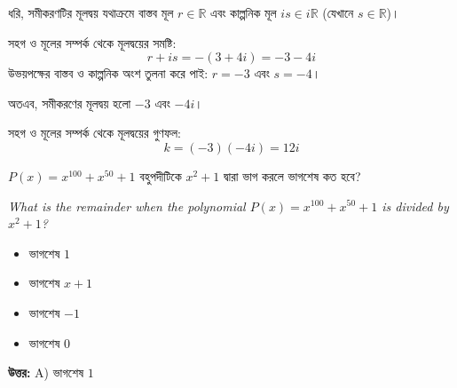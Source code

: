 \documentclass[12pt, a4paper]{article}
\begin{document}
\begin{tcolorbox}[solutionbox={সমাধান (Solution)}]
    \noindent
    ধরি, সমীকরণটির মূলদ্বয় যথাক্রমে বাস্তব মূল $r \in \mathbb{R}$ এবং কাল্পনিক মূল $is \in i\mathbb{R}$ (যেখানে $s \in \mathbb{R}$)। 
    
    সহগ ও মূলের সম্পর্ক থেকে মূলদ্বয়ের সমষ্টি:
    \[ r + is = -(3+4i) = -3 - 4i \]
    উভয়পক্ষের বাস্তব ও কাল্পনিক অংশ তুলনা করে পাই: $r = -3$ এবং $s = -4$। 
    
    অতএব, সমীকরণের মূলদ্বয় হলো $-3$ এবং $-4i$। 
    
    সহগ ও মূলের সম্পর্ক থেকে মূলদ্বয়ের গুণফল:
    \[ k = (-3)(-4i) = 12i \]
\end{tcolorbox}

\vspace{1em}

\begin{tcolorbox}[questionbox={প্রশ্ন (Question) 47}]
    \noindent
    $P(x) = x^{100} + x^{50} + 1$ বহুপদীটিকে $x^2 + 1$ দ্বারা ভাগ করলে ভাগশেষ কত হবে?
    
    \vspace{0.8em}
    \begin{english}
    \noindent\textit{\color{darkgray}
    What is the remainder when the polynomial $P(x) = x^{100} + x^{50} + 1$ is divided by $x^2 + 1$?
    }
    \end{english}
\end{tcolorbox}

\begin{itemize}[label={}, leftmargin=1cm, itemsep=0.5em]
    \item[\textbf{A)}] ভাগশেষ $1$
    \item[\textbf{B)}] ভাগশেষ $x+1$
    \item[\textbf{C)}] ভাগশেষ $-1$
    \item[\textbf{D)}] ভাগশেষ $0$
\end{itemize}

\vspace{0.5em}
\begin{tcolorbox}[answerbox]
    \textbf{\color{success} উত্তর:} A) ভাগশেষ $1$
\end{tcolorbox}
\vspace{1em}
\end{document}
